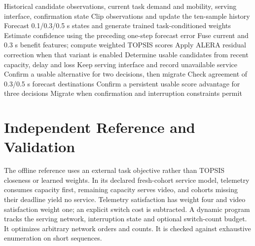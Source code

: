 \documentclass[preprint,12pt]{elsarticle}
\begin{document}
\begin{algorithm}[ht]
\caption{Causal mission-conditioned LAAVHA selection}
\begin{algorithmic}[1]
\Require Historical candidate observations, current task demand and mobility, serving interface, confirmation state
\State Clip observations and update the ten-sample history
\State Forecast 0.1/0.3/0.5 s states and generate trained task-conditioned weights
\State Estimate confidence using the preceding one-step forecast error
\State Fuse current and 0.3 s benefit features; compute weighted TOPSIS scores
\State Apply ALERA residual correction when that variant is enabled
\State Determine usable candidates from recent capacity, delay and loss
  \State Keep serving interface and record unavailable service
  \State Confirm a usable alternative for two decisions, then migrate
\Else
  \State Check agreement of 0.3/0.5 s forecast destinations
  \State Confirm a persistent usable score advantage for three decisions
  \State Migrate when confirmation and interruption constraints permit
\EndIf
\end{algorithmic}
\end{algorithm}

\section{Independent Reference and Validation}\label{sec:sim}
The offline reference uses an external task objective rather than TOPSIS closeness or learned weights. In its declared fresh-cohort service model, telemetry consumes capacity first, remaining capacity serves video, and cohorts missing their deadline yield no service. Telemetry satisfaction has weight four and video satisfaction weight one; an explicit switch cost is subtracted. A dynamic program tracks the serving network, interruption state and optional switch-count budget. It optimizes arbitrary network orders and counts. It is checked against exhaustive enumeration on short sequences.
\end{document}
